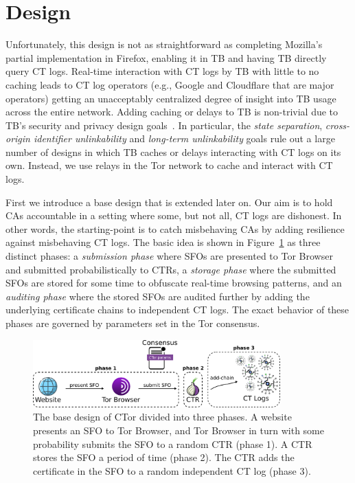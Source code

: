 \section{Design} \label{sec:base}
Unfortunately, this design is not as straightforward as completing
Mozilla's partial implementation in Firefox, enabling it in TB and having TB
directly query CT logs. Real-time interaction with CT logs by TB with little to
no caching leads to CT log operators (e.g., Google and Cloudflare that are major
operators) getting an unacceptably centralized degree of insight into TB usage
across the entire network. Adding caching or delays to TB is non-trivial due to
TB's security and privacy design goals~\cite{FIXME}. In particular, the
\emph{state separation},
\emph{cross-origin identifier unlinkability} and \emph{long-term unlinkability}
goals rule out a large number of designs in which TB caches or delays
interacting with CT logs on its own. Instead, we use relays in the Tor network
to cache and interact with CT logs.

First we introduce a base design that is extended later on.  Our aim is to hold
CAs accountable in a setting where some, but not all, CT logs are dishonest.  In
other words, the starting-point is to catch misbehaving CAs by adding resilience
against misbehaving CT logs.  The basic idea is shown in
Figure~\ref{fig:design-ca} as three distinct phases:
	a \emph{submission phase} where SFOs are presented to Tor Browser
		and submitted probabilistically to CTRs,
	a \emph{storage phase} where the submitted SFOs are stored for some time to
		obfuscate real-time browsing patterns, and
	an \emph{auditing phase} where the stored SFOs are audited further by adding
		the underlying certificate chains to independent CT logs.
The exact behavior of these phases are governed by parameters set in the Tor
consensus.

\begin{figure}
	\centering
	\includegraphics[width=0.85\textwidth]{img/design-ca}
	\caption{%
		The base design of CTor divided into three phases. A website presents an
		SFO to Tor Browser, and Tor Browser in turn with some probability
		submits the SFO to a random CTR (phase 1). A CTR stores the SFO a period
		of time (phase 2). The CTR adds the certificate in the SFO to a random
		independent CT log (phase 3).
	}
	\label{fig:design-ca}
\end{figure}

